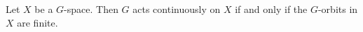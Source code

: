Let $X$ be a $G$-space. Then $G$ acts continuously on $X$ if and only if the $G$-orbits in $X$ are finite.

